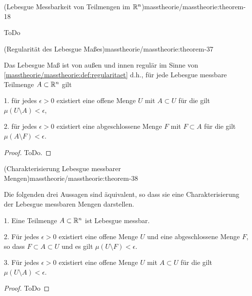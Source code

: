 \begin{theorem}{(Lebesgue Messbarkeit von Teilmengen im \protect\(\mathbb{R}^n\protect\))}{masstheorie/masstheorie:theorem-18}
\begin{emphBox}{}{}
\par
ToDo
\end{emphBox}
\begin{theorem}{(Regularität des Lebesgue Maßes)}{masstheorie/masstheorie:theorem-37}



\par
Das Lebesgue Maß ist von außen und innen regulär im Sinne von \cref{masstheorie/masstheorie:def:regularitaet}  d.h., für jede Lebesgue messbare Teilmenge \(A \subset \mathbb{R}^n\) gilt

\par
1. für jedes \(\epsilon > 0\) existiert eine offene Menge \(U\) mit \(A \subset U\) für die gilt \(\mu(U \setminus A) < \epsilon\),

\par
2. für jedes \(\epsilon > 0\) existiert eine abgeschlossene Menge \(F\) mit \(F \subset A\) für die gilt \(\mu(A \setminus F) < \epsilon\).
\end{theorem}

\begin{proof}
 ToDo.
\end{proof}
\begin{theorem}{(Charakterisierung Lebesgue messbarer Mengen)}{masstheorie/masstheorie:theorem-38}



\par
Die folgenden drei Aussagen sind äquivalent, so dass sie eine Charakterisierung der Lebesgue messbaren Mengen darstellen.

\par
1. Eine Teilmenge \(A \subset \mathbb{R}^n\) ist Lebesgue messbar.

\par
2. Für jedes \(\epsilon > 0\) existiert eine offene Menge \(U\) und eine abgeschlossene Menge \(F\), so dass \(F \subset A \subset U\) und es gilt \(\mu(U \setminus F) < \epsilon\).

\par
3. Für jedes \(\epsilon > 0\) existiert eine offene Menge \(U\) mit \(A \subset U\) für die gilt \(\mu(U \setminus A) < \epsilon\).
\end{theorem}

\begin{proof}
 ToDo
\end{proof}


\end{theorem}
